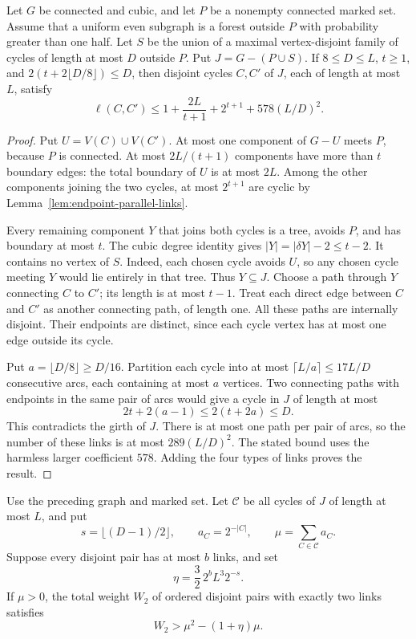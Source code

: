 \begin{lemma}
\label{lem:sharp-uniform-links}
Let $G$ be connected and cubic, and let $P$ be a nonempty connected marked set.
Assume that a uniform even subgraph is a forest outside $P$ with probability greater than one half.
Let $S$ be the union of a maximal vertex-disjoint family of cycles of length at most $D$ outside $P$.
Put $J=G-(P\cup S)$.
If $8\le D\le L$, $t\ge1$, and $2(t+2\lfloor D/8\rfloor)\le D$, then disjoint cycles $C,C'$ of $J$, each of length at most $L$, satisfy
\[
 \ell(C,C')\le1+\frac{2L}{t+1}+2^{t+1}+578(L/D)^2.
\]
\end{lemma}

\begin{proof}
Put $U=V(C)\cup V(C')$.
At most one component of $G-U$ meets $P$, because $P$ is connected.
At most $2L/(t+1)$ components have more than $t$ boundary edges: the total boundary of $U$ is at most $2L$.
Among the other components joining the two cycles, at most $2^{t+1}$ are cyclic by Lemma~\ref{lem:endpoint-parallel-links}.

Every remaining component $Y$ that joins both cycles is a tree, avoids $P$, and has boundary at most $t$.
The cubic degree identity gives $|Y|=|\delta Y|-2\le t-2$.
It contains no vertex of $S$.
Indeed, each chosen cycle avoids $U$, so any chosen cycle meeting $Y$ would lie entirely in that tree.
Thus $Y\subseteq J$.
Choose a path through $Y$ connecting $C$ to $C'$; its length is at most $t-1$.
Treat each direct edge between $C$ and $C'$ as another connecting path, of length one.
All these paths are internally disjoint.
Their endpoints are distinct, since each cycle vertex has at most one edge outside its cycle.

Put $a=\lfloor D/8\rfloor\ge D/16$.
Partition each cycle into at most $\lceil L/a\rceil\le17L/D$ consecutive arcs, each containing at most $a$ vertices.
Two connecting paths with endpoints in the same pair of arcs would give a cycle in $J$ of length at most
\[
 2t+2(a-1)\le2(t+2a)\le D.
\]
This contradicts the girth of $J$.
There is at most one path per pair of arcs, so the number of these links is at most $289(L/D)^2$.
The stated bound uses the harmless larger coefficient $578$.
Adding the four types of links proves the result.
\end{proof}

\begin{lemma}
\label{lem:sharp-half-moment}
Use the preceding graph and marked set.
Let $\mathcal C$ be all cycles of $J$ of length at most $L$, and put
\[
 s=\lfloor(D-1)/2\rfloor,\qquad
 a_C=2^{-|C|},\qquad \mu=\sum_{C\in\mathcal C}a_C.
\]
Suppose every disjoint pair has at most $b$ links, and set
\[
 \eta=\frac32\,2^b L^3 2^{-s}.
\]
If $\mu>0$, the total weight $W_2$ of ordered disjoint pairs with exactly two links satisfies
\[
 W_2>\mu^2-(1+\eta)\mu.
\]
\end{lemma}

